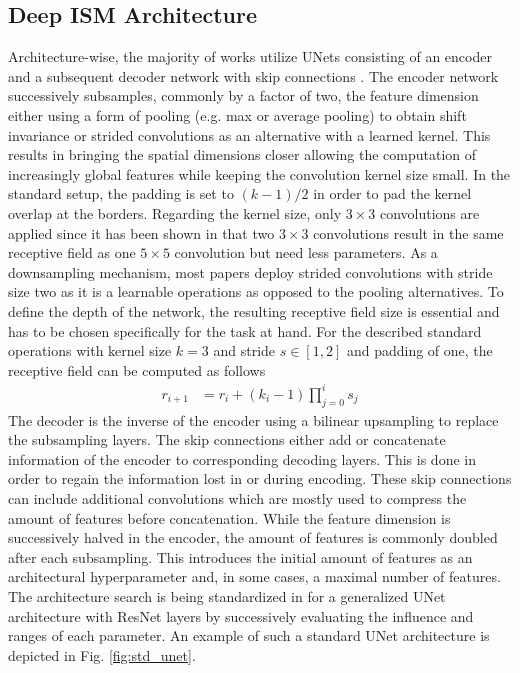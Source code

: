 \subsection{Deep ISM Architecture}
\label{subsec:architecture}
Architecture-wise, the majority of works utilize UNets \cite{ronneberger2015u} consisting of an encoder and a subsequent decoder network with skip connections \cite{prophet2019semantic,sless2019road,wirges2018evidential,weston2019probably,schulter2018learning,lu2019monocular,mani2020monolayout}. The encoder network successively subsamples, commonly by a factor of two, the feature dimension either using a form of pooling (e.g. max or average pooling) to obtain shift invariance or strided convolutions as an alternative with a learned kernel. This results in bringing the spatial dimensions closer allowing the computation of increasingly global features while keeping the convolution kernel size small. In the standard setup, the padding is set to $(k-1)/2$ in order to pad the kernel overlap at the borders. Regarding the kernel size, only $3 \times 3$ convolutions are applied since it has been shown in \cite{simonyan2014very} that two $3 \times 3$ convolutions result in the same receptive field as one $5 \times 5$ convolution but need less parameters. As a downsampling mechanism, most papers deploy strided convolutions with stride size two as it is a learnable operations as opposed to the pooling alternatives. To define the depth of the network, the resulting receptive field size is essential and has to be chosen specifically for the task at hand. For the described standard operations with kernel size $k=3$ and stride $s \in [1,2]$ and padding of one, the receptive field can be computed as follows
\begin{align}
	\label{eq:receptive_field}
	r_{i+1} &= r_i + (k_i-1)\prod_{j=0}^{i}s_j
\end{align}
The decoder is the inverse of the encoder using a bilinear upsampling \cite{odena2016deconvolution} to replace the subsampling layers. The skip connections either add or concatenate information of the encoder to corresponding decoding layers. This is done in order to regain the information lost in or during encoding. These skip connections can include additional convolutions which are mostly used to compress the amount of features before concatenation. While the feature dimension is successively halved in the encoder, the amount of features is commonly doubled after each subsampling. This introduces the initial amount of features as an architectural hyperparameter and, in some cases, a maximal number of features. The architecture search is being standardized in \cite{radosavovic2020designing} for a generalized UNet architecture with ResNet layers by successively evaluating the influence and ranges of each parameter. An example of such a standard UNet architecture is depicted in Fig. \ref{fig:std_unet}.
